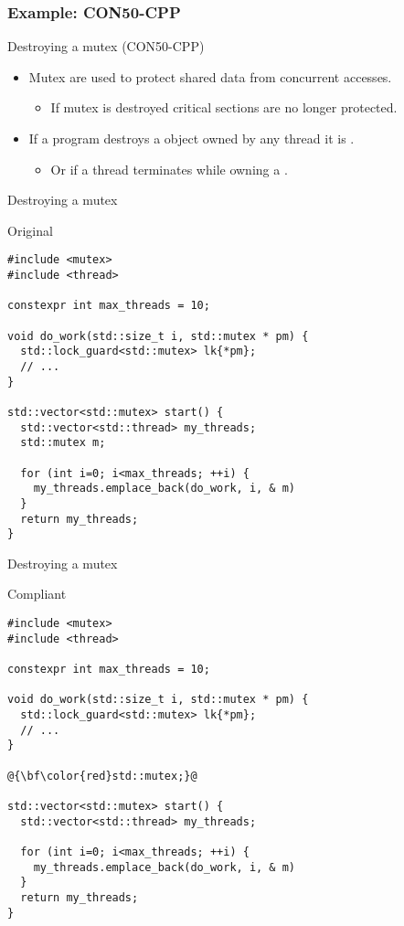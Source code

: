 \subsubsection{Example: CON50-CPP}

\begin{frame}[t]{Destroying a mutex (CON50-CPP)}
\begin{itemize}
  \item Mutex are used to protect shared data from concurrent accesses.
    \begin{itemize}
      \item If mutex is destroyed critical sections are no longer protected.
    \end{itemize}

  \vfill
  \item If a program destroys a  object owned by any thread
        it is .
    \begin{itemize}
      \item Or if a thread terminates while owning a .
    \end{itemize}
\end{itemize}
\end{frame}

\begin{frame}[t,fragile]{Destroying a mutex}
\begin{block}{Original}
\begin{lstlisting}[basicstyle=\tiny]
#include <mutex>
#include <thread>

constexpr int max_threads = 10;

void do_work(std::size_t i, std::mutex * pm) {
  std::lock_guard<std::mutex> lk{*pm};
  // ...
}

std::vector<std::mutex> start() {
  std::vector<std::thread> my_threads;
  std::mutex m;

  for (int i=0; i<max_threads; ++i) {
    my_threads.emplace_back(do_work, i, & m)
  }
  return my_threads;
}
\end{lstlisting}
\end{block}
\end{frame}

\begin{frame}[t,fragile]{Destroying a mutex}
\begin{block}{Compliant}
\begin{lstlisting}[basicstyle=\tiny,escapechar=@]
#include <mutex>
#include <thread>

constexpr int max_threads = 10;

void do_work(std::size_t i, std::mutex * pm) {
  std::lock_guard<std::mutex> lk{*pm};
  // ...
}

@{\bf\color{red}std::mutex;}@

std::vector<std::mutex> start() {
  std::vector<std::thread> my_threads;

  for (int i=0; i<max_threads; ++i) {
    my_threads.emplace_back(do_work, i, & m)
  }
  return my_threads;
}
\end{lstlisting}
\end{block}
\end{frame}

